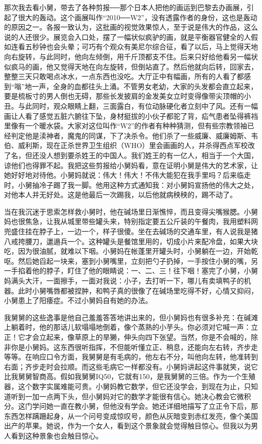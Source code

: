 那次我去看小舅，带去了各种剪报──那个日本人把他的画运到巴黎去办画展，引起了很大的轰动。这个画展叫作“2010──W2”，没有透露作者的身份，这也是轰动的原因之一。各报一致认为，这批画的视觉效果惊人，至于说是伟大的作品，这么说的人还很少。展览会入口处，摆了一幅状似疯驴的画，就是平衡器官健全的人假如连看五秒钟也会头晕；可巧有个观众有美尼尔综合征，看了以后，马上觉得天地向右旋转，与此同时，他向左倾倒，用千斤顶都支不住。后来只好给他看另一幅状似疯马的画，他又觉得天地在向左旋转，但倒站直了。然后他就向后转，回家去，整整三天只敢喝点冰水，一点东西也没吃。大厅正中有幅画，所有的人看了都感到“嗡”地一声，全身的血都往头上涌。不管男女老幼，大家的头发都会直立起来，要是梳板寸的男人倒也无碍，那些长发披肩的金发美女立时变得像带尖顶帽的小丑。与此同时，观众眼睛上翻，三面露白，有位动脉硬化者立刻中了风。还有一幅画让人看了感觉五脏六腑往下坠，身材挺拔的小伙子都驼了背，疝气患者坠得裤裆里像有一个暖水袋。大家对这位叫作“W2”的作者有种种猜测，但有些宗教领袖已经判定他是渎神者，魔鬼的同谋，下了决杀令。他们杀了一些威廉、威廉姆斯、韦伯、威利斯，现在正杀世界卫生组织（WHO）里会画画的人，并杀得西点军校改了名，但还没人想到要杀姓王的中国人。我们姓王的有一亿人，相当于一个大国，谅他们也得罪不起。我把这些剪报给小舅妈看，意在证明小舅是伟大的艺术家，让她好好地对待他。小舅妈就说：伟大！伟大！不伟大能犯在我手里吗？后来临走时，小舅抽冷子踢了我一脚。他用这种方式通知我：对小舅妈宣扬他的伟大之处，对他本人并无好处。这是他最后一次踢我，以后他就病秧秧的，踢不动了。 

当在我沉迷于思索怎样救小舅时，他在碱场里日渐憔悴，而且变得尖嘴猴腮。小舅妈也很焦急，让我从城里带些罐头来，特别指定要五公斤装的午餐肉，我用塑料网兜盛住挂在脖子上，一边一个，样子很傻。坐在去碱场的交通车里，有人说我是猪八戒挎腰刀，邋遢兵一个。这种罐头是餐馆里用的，切成小片来配冷盘，如果大块吃，因为很油腻，就难以下咽。小舅妈在帐蓬里开罐头时，小舅躺在一边，开始乾呕。然后她舀起一块来，塞到小舅嘴里，立刻把勺子扔掉，一手按住小舅的嘴，另一手掐着他的脖子，盯住了他的眼睛说：一、二、三！往下咽！塞完了小舅，小舅妈满头大汗，一面擦手，一面对我说：小子，去打听一下，哪儿有卖填鸭子的机器。此时小舅嘴唇都被捏肿，和鸭子真的很像了在碱场里吃得不好，心情又抑闷，小舅患上了阳痿症。不过小舅妈自有她的办法。 

我舅舅的这些逸事是他自己羞羞答答地讲出来的，但小舅妈也有很多补充：在碱滩上躺着时，他的那话儿软塌塌地倒着，像个蒸熟的小芋头。你必须对它喊一声：立正！它才会立起来，像草原上的旱獭，伸头向四下张望。当然，你是不会喊的，除非你是小舅妈。这东西很听指挥，不但能听懂立正、稍息，还能向左右转，齐步走等等。在响应口令方面，我舅舅是有毛病的，他左右不分，叫他向左转，他准转到右面；齐步走时会拉顺。而这些毛病它一样都没有。小舅妈讲起这件事就笑，说它比我舅舅智商高。假如我舅舅IQ50，它就有150，是我舅舅的三倍。作为一个生殖器，这个数字实属难能可贵。小舅妈教它数学，但它还没学会，到现在为止，只知道听到一加一点两下头，但小舅妈对它的数学才能很有信心。她决心教会它微积分。这门学问她一直在教小舅，但他没有学会。她还详细地描写了立正令下后，那东西怎样蹒跚起身，从一个问号变成惊叹号，颜色从灰暗变到赤红发亮，像个美国出产的苹果。她说，作为一个女人，看到这个景象就会觉得触目惊心。但我以为男人看到这种景象也会触目惊心。 

